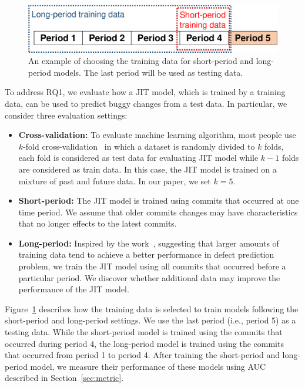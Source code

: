 \begin{figure}
	\center
	\includegraphics[scale=0.36]{figs/split.pdf}
	\caption{An example of choosing the training data for short-period and long-period models. The last period will be used as testing data.}
	\label{fig:splitting}
\end{figure}

To address RQ1, we evaluate how a JIT model, which is trained by a training data, can be used to predict buggy changes from a test data. In particular, we consider three evaluation settings: 
\begin{itemize}
\item \textbf{Cross-validation:} To evaluate machine learning algorithm, most people use $k$-fold cross-validation~\cite{kohavi1995study} in which a dataset is randomly divided to $k$ folds, each fold is considered as test data for evaluating JIT model while $k - 1$ folds are considered as train data. In this case, the JIT model is trained on a mixture of past and future data. In our paper, we set $k = 5$.
\item \textbf{Short-period:} The JIT model is trained using commits that occurred at one time period. We assume that older commits changes may have characteristics that no longer effects to the latest commits. 
\item \textbf{Long-period:} Inspired by the work~\cite{rahman2013sample}, suggesting that larger amounts of training data tend to achieve a better performance in defect prediction problem, we train the JIT model using all commits that occurred before a particular period. We discover whether additional data may improve the performance of the JIT model. 
\end{itemize} 

Figure~\ref{fig:splitting} describes how the training data is selected to train models  following the short-period and long-period settings. We use the last period (i.e., period 5) as a testing data. While the short-period model is trained using the commits that occurred during period 4, the long-period model is trained using the commits that occurred from period 1 to period 4. After training the short-period and long-period model, we measure their performance of these models using AUC described in Section~\ref{sec:metric}.


